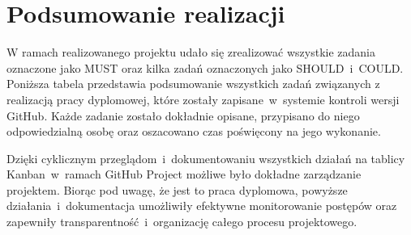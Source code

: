     \section{Podsumowanie realizacji}
    \label{sec:podsumowanie realizacji}
    W ramach realizowanego projektu udało się zrealizować wszystkie zadania oznaczone jako MUST oraz kilka zadań oznaczonych jako SHOULD~i~COULD. 
    Poniższa tabela przedstawia podsumowanie wszystkich zadań związanych z realizacją pracy dyplomowej, które zostały zapisane~w~systemie kontroli wersji GitHub. 
    Każde zadanie zostało dokładnie opisane, przypisano do niego odpowiedzialną osobę oraz oszacowano czas poświęcony na jego wykonanie.

    Dzięki cyklicznym przeglądom~i~dokumentowaniu wszystkich działań na tablicy Kanban~w~ramach GitHub Project możliwe było 
    dokładne zarządzanie projektem. Biorąc pod uwagę, że jest to praca dyplomowa, powyższe działania~i~dokumentacja umożliwiły efektywne monitorowanie postępów oraz zapewniły 
    transparentność~i~organizację całego procesu projektowego.

